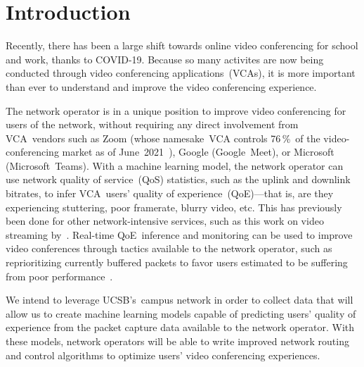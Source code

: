 \section{Introduction}\label{introduction}


    Recently, there has been a large shift towards online video conferencing for school and work, thanks to COVID-19. Because so many activites are now being conducted through video conferencing applications~(VCAs), it is more important than ever to understand and improve the video conferencing experience.

    The network operator is in a unique position to improve video conferencing for users of the network, without requiring any direct involvement from VCA~vendors such as Zoom (whose namesake~VCA controls 76\,\%~of the video-conferencing market as of June~2021~\autocite{kim2021}), Google (Google~Meet), or Microsoft (Microsoft~Teams). With a machine learning model, the network operator can use network quality of service~(QoS) statistics, such as the uplink and downlink bitrates, to infer VCA~users' quality of experience~(QoE)---that is, are they experiencing stuttering, poor framerate, blurry video, etc. This has previously been done for other network-intensive services, such as this work on video streaming by~\textcite{ChenYanjiao2015FQtQ}. Real-time QoE~inference and monitoring can be used to improve video conferences through tactics available to the network operator, such as reprioritizing currently buffered packets to favor users estimated to be suffering from poor performance~\autocite{DinakiHosseinEbrahimi2021FVQW}.

    We intend to leverage UCSB's~campus network in order to collect data that will allow us to create machine learning models capable of predicting users' quality of experience from the packet capture data available to the network operator. With these models, network operators will be able to write improved network routing and control algorithms to optimize users' video conferencing experiences. %

